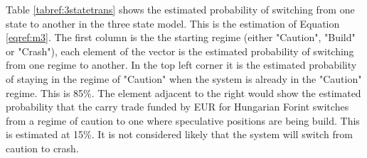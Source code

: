 \documentclass[12pt, a4paper, oneside]{article} %
\begin{document}

Table \ref{tabref:3statetrans} shows the estimated probability of switching from one state to another in the three state model.  This is the estimation of Equation \ref{eqref:m3}.  The first column is the  the starting regime (either "Caution", "Build" or "Crash"), each element of the vector is the estimated probability of switching from one regime to another. In the top left corner it is the estimated probability of staying in the regime of "Caution" when the system is already in the "Caution" regime.  This is 85\%.  The element adjacent to the right would show the estimated probability that the carry trade funded by EUR for Hungarian Forint switches from a regime of caution to one where speculative positions are being build.  This is estimated at 15\%.  It is not considered likely that the system will switch from caution to crash.  
\end{document}

